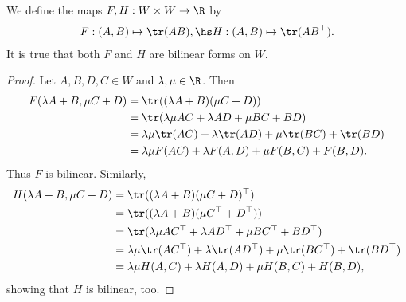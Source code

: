 \documentclass{article}
\begin{document}
\begin{claim*}[1b]
	We define the maps $F,H:W\times W\to\R$ by
	\begin{align*}
		F:(A,B)\mapsto \tr(AB),\hs H:(A,B)\mapsto \tr(AB^\top).
	\end{align*}
	It is true that both $F$ and $H$ are bilinear forms on $W$.
	\begin{proof}
		Let $A,B,D,C\in W$ and $\lambda,\mu\in\R$. Then
		\begin{align*}
			F(\lambda A+B,\mu C + D) & =\tr((\lambda A+B)(\mu C+D))                               \\
			                         & =\tr(\lambda\mu AC + \lambda AD + \mu BC + BD)             \\
			                         & =\lambda\mu\tr (AC) + \lambda\tr(AD) +\mu\tr(BC) + \tr(BD) \\
			                         & = \lambda\mu F(AC)+ \lambda F(A,D) + \mu F(B,C) + F(B,D).
		\end{align*}
		Thus $F$ is bilinear. Similarly,
		\begin{align*}
			H(\lambda A+B,\mu C + D) & =\tr((\lambda A+B)(\mu C+D)^\top)                                              \\
			                         & =\tr((\lambda A+B)(\mu C^\top + D^\top))                                       \\
			                         & =\tr(\lambda\mu AC^\top + \lambda AD^\top + \mu BC^\top + BD^\top)             \\
			                         & =\lambda\mu\tr (AC^\top) + \lambda\tr(AD^\top) +\mu\tr(BC^\top) + \tr(BD^\top) \\
			                         & = \lambda\mu H(A,C)+ \lambda H(A,D) + \mu H(B,C) + H(B,D),
		\end{align*}
		showing that $H$ is bilinear, too.
	\end{proof}
\end{claim*}
\end{document}
